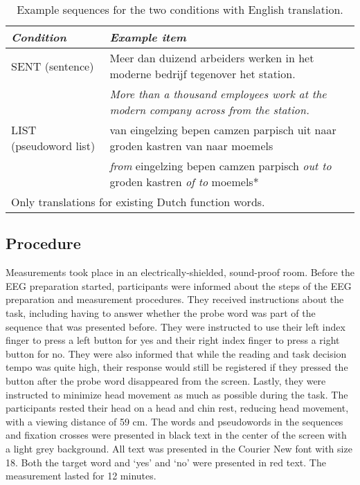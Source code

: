 \begin{table}[ht]
    \captionsetup{justification=raggedright, singlelinecheck=false, font = normal} %
    \renewcommand{\arraystretch}{1.5} %
    \caption{Example sequences for the two conditions with English translation.}
    \label{tab:example_sequences}
    \small
    \begin{tabular}{lp{8.2cm}}
    \hline
    \textit{Condition} & \textit{Example item} \\
    \hline
    \small{SENT (sentence)} & \small{Meer dan duizend arbeiders werken in het moderne bedrijf tegenover het station.} \\
     & \small{\textit{More than a thousand employees work at the modern company across from the station.}} \\
    \small{LIST (pseudoword list)} & \small{van eingelzing bepen camzen parpisch uit naar groden kastren van naar moemels} \\
     & \small{\textit{from} eingelzing bepen camzen parpisch \textit{out to} groden kastren \textit{of to} moemels*} \\
    \hline
    \multicolumn{2}{l}{\footnotesize *Only translations for existing Dutch function words.} \\
    \end{tabular}
    \normalsize
\end{table}



\subsection{Procedure}
Measurements took place in an electrically-shielded, sound-proof room. Before the EEG preparation started, participants were informed about the steps of the EEG preparation and measurement procedures. They received instructions about the task, including having to answer whether the probe word was part of the sequence that was presented before. They were instructed to use their left index finger to press a left button for yes and their right index finger to press a right button for no. They were also informed that while the reading and task decision tempo was quite high, their response would still be registered if they pressed the button after the probe word disappeared from the screen. Lastly, they were instructed to minimize head movement as much as possible during the task. The participants rested their head on a head and chin rest, reducing head movement, with a viewing distance of 59 cm. The words and pseudowords in the sequences and fixation crosses were presented in black text in the center of the screen with a light grey background. All text was presented in the Courier New font with size 18. Both the target word and `yes' and `no' were presented in red text. The measurement lasted for 12 minutes. 

